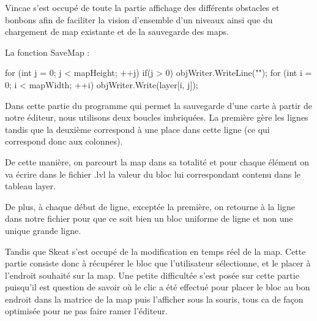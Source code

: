 \documentclass [11pt]{report}
\begin{document}
			 Vincae s'est occupé de toute la partie affichage des différents obstacles et bonbons afin de faciliter la vision d'ensemble d'un niveaux ainsi que du chargement de map existante et de la sauvegarde des maps.\\
			 
			 
			 
	\newpage
		
	La fonction SaveMap : 
			 
 	\vspace{10mm}
			 
	 \begin{mylisting}
	
      for (int j = 0; j < mapHeight; ++j)
      {
        if(j > 0)
           objWriter.WriteLine("");
        for (int i = 0; i < mapWidth; ++i)
        {
           objWriter.Write(layer[i, j]);
        }
      }
      
	\end{mylisting}
		
		
		\vspace{10mm}
		
		
		
		Dans cette partie du programme qui permet la sauvegarde d'une carte à partir de  notre éditeur, nous utilisons deux boucles imbriquées. La première gère les lignes tandis que la deuxième correspond à une place dans cette ligne (ce qui correspond donc aux colonnes).
		
		De cette manière, on parcourt la map dans sa totalité et pour chaque élément on va écrire dans le fichier .lvl la valeur du bloc lui correspondant contenu dans le tableau layer. 
		
		De plus, à chaque début de ligne, exceptée la première, on retourne à la ligne dans notre fichier pour que ce soit bien un bloc uniforme de ligne et non une unique grande ligne.\\
		
		\vspace{10mm}
		
		
		Tandis que Skeat s'est occupé de la modification en temps réel de la map. Cette partie consiste donc à récupérer le bloc que l'utilisateur sélectionne, et le placer à l'endroit souhaité sur la map. Une petite difficultée s'est posée sur cette partie puisqu'il est question de savoir où le clic a été effectué pour placer le bloc au bon endroit dans la matrice de la map puis l'afficher sous la souris, tous ca de façon optimisée pour ne pas faire ramer l'éditeur.\\
			 
\end{document}
